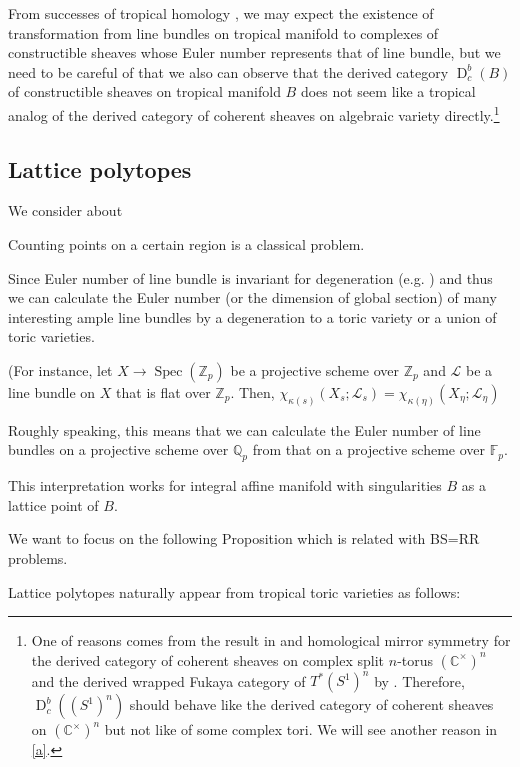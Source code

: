 \documentclass[a4paper,dvipdfmx,reqno,12pt]{amsart}
\theoremstyle{definition}
\newcommand{\C}{\mathbb{C}}%
\newcommand{\Q}{\mathbb{Q}}%
\newcommand{\Z}{\mathbb{Z}}%
\newcommand{\mb}[1]{\mathbb{#1}}%
\newcommand{\mcal}[1]{\mathcal{#1}}%
\newcommand{\opn}[1]{\operatorname{#1}}
\numberwithin{equation}{section}
\begin{document}
From successes of tropical homology \cite{itenbergTropicalHomology2019b}, we 
may expect the existence of transformation from 
line bundles on tropical manifold to complexes of
constructible sheaves whose Euler number 
represents that of line bundle, but we need to 
be careful of that we also can observe that
the derived category $\opn{D}_{c}^{b}(B)$
of constructible sheaves on 
tropical manifold $B$ does not seem like a tropical 
analog of the derived category of coherent 
sheaves on algebraic variety directly.\footnote{One of reasons
comes from the result in \cite{MR2449059,MR2565051} and 
homological mirror symmetry for 
the derived category of coherent sheaves on complex split $n$-torus 
$(\C^{\times})^{n}$ and the derived wrapped Fukaya category of $T^{*}(S^{1})^{n}$
by \cite{MR2822213}.
Therefore, $\opn{D}_c^{b}((S^{1})^{n})$ should behave like 
the derived category of coherent sheaves on $(\C^{\times})^{n}$
but not like of some complex tori.
We will see another reason in \cref{a}.}


\subsection{Lattice polytopes}

We consider about 

Counting points on a certain region is a classical problem.

Since Euler number of line bundle is invariant for 
degeneration (e.g. \cite[p.50]{}) and thus we can calculate
the Euler number (or the dimension of global section)
 of many interesting ample line bundles
by a degeneration to a toric variety or a union of toric
varieties. 

(For instance, let $X\to \opn{Spec}(\Z_{p})$ be a
projective scheme over $\Z_{p}$ and $\mcal{L}$
be a line bundle on $X$ that is flat over $\Z_{p}$.
Then, $\chi_{\kappa(s)}(X_s;\mcal{L}_s)=\chi_{\kappa(\eta)}(X_{\eta};\mcal{L}_{\eta})$

Roughly speaking, this means that
we can calculate the Euler number of line bundles on
a projective scheme over $\Q_p$ from that on a 
projective scheme over $\mb{F}_p$.  

This interpretation works for integral affine manifold 
with singularities $B$ as a lattice point of $B$. 

We want to focus on the following Proposition which is related with
BS=RR problems.

Lattice polytopes naturally appear from tropical toric
varieties as follows: 
\end{document}
